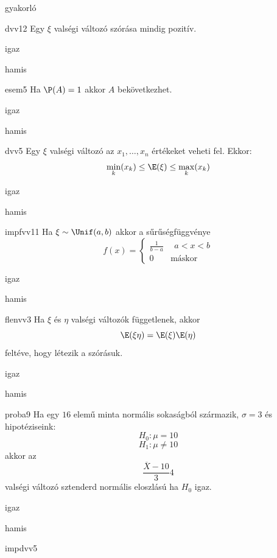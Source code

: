 \documentclass[12pt]{article}
\begin{document}
\begin{quiz}{gyakorló}

\begin{multi}[feedback={Egy konstans v.v-nak 0 a szórása.}]{dvv12}
Egy $\xi$ valségi változó szórása mindig pozitív.
\item igaz
\item* hamis
\end{multi}
\begin{multi}[feedback={Nókoment.}]{esem5}
Ha $\P(A)=1$ akkor $A$ bekövetkezhet.
\item* igaz
\item hamis
\end{multi}
\begin{multi}[feedback={Az adott feltételek mellet a várható érték egy súlyozott közép.}]{dvv5}
Egy $\xi$ valségi változó az $x_1,\ldots, x_n$ értékeket veheti fel. Ekkor:
$$
\min_k(x_k)\le \E(\xi) \le \max_k(x_k)
$$
\item* igaz
\item hamis
\end{multi}
\begin{multi}[feedback={Def.}]{impfvv11}
Ha $\xi\sim \Unif(a,b)$ akkor a sűrűségfüggvénye 
$$
f(x)=
\begin{cases}
\frac{1}{b-a} & \ \ a<x<b \\
0 & \text{máskor} 
\end{cases}
$$
\item* igaz
\item hamis
\end{multi}
\begin{multi}[feedback={Tétel.}]{flenvv3}
Ha $\xi$ és $\eta$ valségi változók függetlenek, akkor
$$
\E(\xi \eta)=\E(\xi)\E(\eta)
$$
feltéve, hogy létezik a szórásuk.
\item* igaz
\item hamis
\end{multi}
\begin{multi}[feedback={Igen, éppen ez alapján tudunk dönteni. Ahhoz képest hogy sztenderd normális átlagos, tipikus értéket, vagy kiugró, extrém értéket látunk.}]{proba9}
Ha egy $16$ elemű minta normális sokaságból származik, $\sigma=3$ és hipotéziseink:
$$
H_0: \mu=10
$$
$$
H_1: \mu\neq 10
$$
akkor az 
$$
\frac{\overline{X}-10}{3}4
$$
valségi változó sztenderd normális eloszlású ha $H_0$ igaz.
\item* igaz
\item hamis
\end{multi}
\begin{multi}[feedback={Def.}]{impdvv5}

\end{multi}
\end{quiz}
\end{document}
